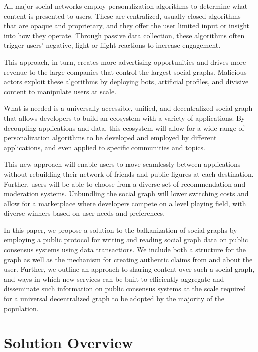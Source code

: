 \documentclass[12pt,letterpaper]{article}
\begin{document}
All major social networks employ personalization algorithms to determine what content is
presented to users. These are centralized, usually closed algorithms that are opaque and
proprietary, and they offer the user limited input or insight into how they operate.
Through passive data collection, these algorithms often trigger users' negative,
fight-or-flight reactions to increase engagement.\cite{psychology_today_2017}

This approach, in turn, creates more advertising opportunities and drives more revenue to
the large companies that control the largest social graphs. Malicious actors exploit these
algorithms by deploying bots, artificial profiles, and divisive content to manipulate users
at scale.


What is needed is a universally accessible, unified, and decentralized social graph that
allows developers to build an ecosystem with a variety of applications. By decoupling
applications and data, this ecosystem will allow for a wide range of personalization
algorithms to be developed and employed by different applications, and even applied to
specific communities and topics.

This new approach will enable users to move seamlessly between applications without
rebuilding their network of friends and public figures at each destination. Further, users
will be able to choose from a diverse set of recommendation and moderation systems.
Unbundling the social graph will lower switching costs and allow for a marketplace where
developers compete on a level playing field, with diverse winners based on user needs and
preferences.


In this paper, we propose a solution to the balkanization of social graphs by employing a
public protocol for writing and reading social graph data on public consensus systems using
data transactions. We include both a structure for the graph as well as the mechanism for
creating authentic claims from and about the user. Further, we outline an approach to
sharing content over such a social graph, and ways in which new services can be built to
efficiently aggregate and disseminate such information on public consensus systems at the
scale required for a universal decentralized graph to be adopted by the majority of the
population.

\section{Solution Overview}\label{sec:solution_overview}
\end{document}
